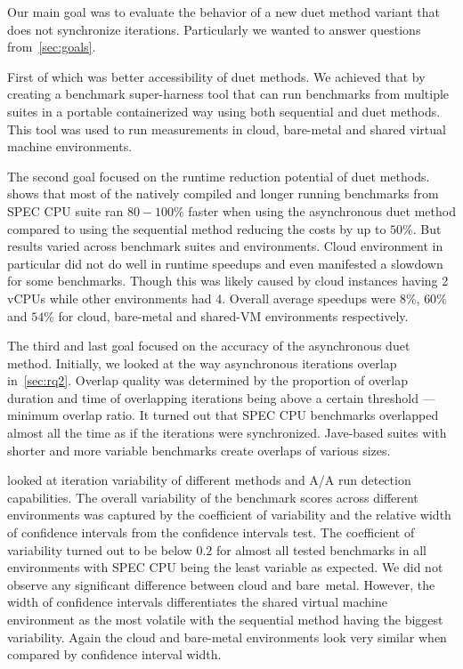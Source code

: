 
Our main goal was to evaluate the behavior of a new duet method variant that does not synchronize iterations.
Particularly we wanted to answer questions from~\cref{sec:goals}.

First of which was better accessibility of duet methods.
We achieved that by creating a benchmark super-harness tool that can run benchmarks from multiple suites in a portable containerized way using both sequential and duet methods.
This tool was used to run measurements in cloud, bare-metal and shared virtual machine environments.

The second goal focused on the runtime reduction potential of duet methods.
 shows that most of the natively compiled and longer running benchmarks from SPEC CPU suite ran $80 - 100\%$ faster when using the asynchronous duet method compared to using the sequential method reducing the costs by up to $50\%$.
But results varied across benchmark suites and environments.
Cloud environment in particular did not do well in runtime speedups and even manifested a slowdown for some benchmarks.
Though this was likely caused by cloud instances having 2 vCPUs while other environments had 4.
Overall average speedups were $8\%$, $60\%$ and $54\%$ for cloud, \mbox{bare-metal} and \mbox{shared-VM} environments respectively.

The third and last goal focused on the accuracy of the asynchronous duet method.
Initially, we looked at the way asynchronous iterations overlap in~\cref{sec:rq2}.
Overlap quality was determined by the proportion of overlap duration and time of overlapping iterations being above a certain threshold --- minimum overlap ratio.
It turned out that SPEC CPU benchmarks overlapped almost all the time as if the iterations were synchronized.
\mbox{Jave-based} suites with shorter and more variable benchmarks create overlaps of various sizes.

 looked at iteration variability of different methods and A/A run detection capabilities.
The overall variability of the benchmark scores across different environments was captured by the coefficient of variability and the relative width of confidence intervals from the confidence intervals test.
The coefficient of variability turned out to be below $0.2$ for almost all tested benchmarks in all environments with SPEC CPU being the least variable as expected.
We did not observe any significant difference between cloud and \mbox{bare metal}.
However, the width of confidence intervals differentiates the shared virtual machine environment as the most volatile with the sequential method having the biggest variability.
Again the cloud and \mbox{bare-metal} environments look very similar when compared by confidence interval width.

